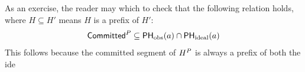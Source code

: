\documentclass[]             %
{NASA}                       %
\theoremstyle{definition}
\begin{document}
As an exercise, the reader may which to check that the following
relation holds, where $H \subseteq H'$ means $H$ is a prefix of $H'$:
\begin{equation}\label{eqn:conit-committed-subset-ideal}
  \mathsf{Committed}^{P} \subseteq \mathsf{PH}_{\mathrm{obs}}(a) \cap \mathsf{PH}_{\mathrm{ideal}}(a)
\end{equation}
This follows because the committed segment of $H^{P}$ is
always a prefix of both the ide
\end{document}
